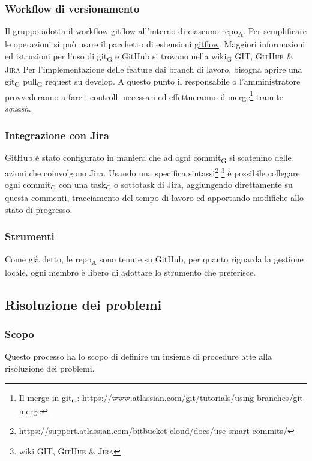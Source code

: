     \subsubsection{Workflow di versionamento}
        Il gruppo adotta il workflow \href{https://www.atlassian.com/git/tutorials/comparing-workflows/gitflow-workflow}{gitflow} all'interno di ciascuno repo\textsubscript{A}. Per semplificare le operazioni si può usare il pacchetto di estensioni \href{http://danielkummer.github.io/git-flow-cheatsheet/}{gitflow}. Maggiori informazioni ed istruzioni per l'uso di git\textsubscript{G} e GitHub si trovano nella wiki\textsubscript{G} \textsc{GIT, GitHub \& Jira}
            Per l'implementazione delle feature dai branch di lavoro, bisogna aprire una git\textsubscript{G} pull\textsubscript{G} request su develop. A questo punto il responsabile o l'amministratore provvederanno a fare i controlli necessari ed effettueranno il merge\footnote{Il merge in git\textsubscript{G}: \url{https://www.atlassian.com/git/tutorials/using-branches/git-merge}} tramite \textit{squash}.

    \subsubsection{Integrazione con Jira}
    \label{jiraintegration}
        GitHub è stato configurato in maniera che ad ogni commit\textsubscript{G} si scatenino delle azioni che coinvolgono Jira. Usando una specifica sintassi\footnote{\url{https://support.atlassian.com/bitbucket-cloud/docs/use-smart-commits/}} \footnote{wiki \textsc{GIT, GitHub \& Jira}} è possibile collegare ogni commit\textsubscript{G} con una task\textsubscript{G} o sottotask di Jira, aggiungendo direttamente su questa commenti, tracciamento del tempo di lavoro ed apportando modifiche allo stato di progresso.

    \subsubsection{Strumenti}
    Come già detto, le repo\textsubscript{A} sono tenute su GitHub, per quanto riguarda la gestione locale, ogni membro è libero di adottare lo strumento che preferisce.


\subsection{Risoluzione dei problemi}
    \label{risoluzioneproblemi}
    \subsubsection{Scopo}
        Questo processo ha lo scopo di definire un insieme di procedure atte alla risoluzione dei problemi.

